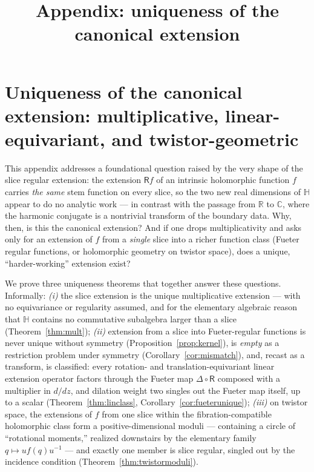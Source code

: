 \documentclass[11pt]{amsart}
\title{Appendix: uniqueness of the canonical extension}
\theoremstyle{definition}
\theoremstyle{remark}
\begin{document}
\maketitle
\appendix

\providecommand{\HH}{\mathbb{H}}
\providecommand{\CC}{\mathbb{C}}
\providecommand{\RR}{\mathbb{R}}
\providecommand{\PP}{\mathbb{P}}
\providecommand{\Sph}{\mathbb{S}}
\providecommand{\CF}{\mathcal{D}}
\providecommand{\OR}{\mathcal{O}_{\RR}(\CC)}
\providecommand{\Rext}{\mathsf{R}}
\providecommand{\im}{\operatorname{Im}}
\providecommand{\re}{\operatorname{Re}}

\section{Uniqueness of the canonical extension: multiplicative, linear-equivariant, and twistor-geometric}\label{app:uniqueness}

This appendix addresses a foundational question raised by the very shape of
the slice regular extension: the extension $\Rext f$ of an intrinsic
holomorphic function $f$ carries \emph{the same} stem function on every
slice, so the two new real dimensions of $\HH$ appear to do no analytic
work --- in contrast with the passage from $\RR$ to $\CC$, where the
harmonic conjugate is a nontrivial transform of the boundary data.  Why,
then, is this the canonical extension?  And if one drops multiplicativity
and asks only for an extension of $f$ from a \emph{single} slice into a
richer function class (Fueter regular functions, or holomorphic geometry on
twistor space), does a unique, ``harder-working'' extension exist?

We prove three uniqueness theorems that together answer these questions.
Informally: \emph{(i)} the slice extension is the unique multiplicative
extension --- with no equivariance or regularity assumed, and for the
elementary algebraic reason that $\HH$ contains no commutative subalgebra
larger than a slice (Theorem~\ref{thm:mult}); \emph{(ii)} extension from a
slice into Fueter-regular functions is never unique without symmetry
(Proposition~\ref{prop:kernel}), is \emph{empty} as a restriction problem
under symmetry (Corollary~\ref{cor:mismatch}), and, recast as a transform,
is classified: every rotation- and translation-equivariant linear
extension operator factors through the Fueter map $\Delta\circ\Rext$
composed with a multiplier in $d/dz$, and dilation weight two singles out
the Fueter map itself, up to a scalar
(Theorem~\ref{thm:linclass}, Corollary~\ref{cor:fueterunique});
\emph{(iii)} on twistor space, the extensions of $f$ from one slice within
the fibration-compatible holomorphic class form a positive-dimensional
moduli --- containing a circle of ``rotational moments,'' realized
downstairs by the elementary family $q\mapsto uf(q)u^{-1}$ --- and exactly
one member is slice regular, singled out by the incidence condition
(Theorem~\ref{thm:twistormoduli}).
\end{document}
